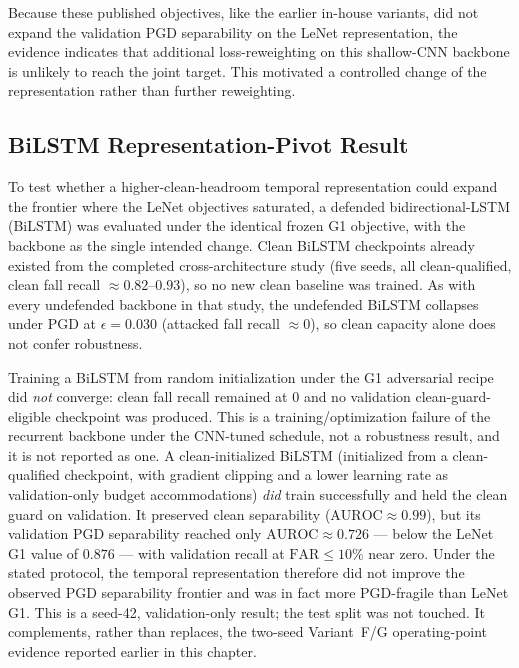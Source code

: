 Because these published objectives, like the earlier in-house variants, did not expand the validation PGD
separability on the LeNet representation, the evidence indicates that additional loss-reweighting on this
shallow-CNN backbone is unlikely to reach the joint target. This motivated a controlled change of the
representation rather than further reweighting.


\subsection{BiLSTM Representation-Pivot Result}
\label{subsec:ch6-bilstm-pivot}

To test whether a higher-clean-headroom temporal representation could expand the frontier where the LeNet
objectives saturated, a defended bidirectional-LSTM (BiLSTM) was evaluated under the identical frozen G1
objective, with the backbone as the single intended change. Clean BiLSTM checkpoints already existed from
the completed cross-architecture study (five seeds, all clean-qualified, clean fall recall \(\approx
0.82\)--\(0.93\)), so no new clean baseline was trained. As with every undefended backbone in that study,
the undefended BiLSTM collapses under PGD at \(\epsilon=0.030\) (attacked fall recall \(\approx 0\)), so
clean capacity alone does not confer robustness.

Training a BiLSTM from random initialization under the G1 adversarial recipe did \emph{not} converge: clean
fall recall remained at \(0\) and no validation clean-guard-eligible checkpoint was produced. This is a
training/optimization failure of the recurrent backbone under the CNN-tuned schedule, not a robustness
result, and it is not reported as one. A clean-initialized BiLSTM (initialized from a clean-qualified
checkpoint, with gradient clipping and a lower learning rate as validation-only budget accommodations)
\emph{did} train successfully and held the clean guard on validation. It preserved clean separability
(\(\mathrm{AUROC}\approx 0.99\)), but its validation PGD separability reached only
\(\mathrm{AUROC}\approx 0.726\) --- below the LeNet G1 value of \(0.876\) --- with validation recall at
\(\mathrm{FAR}\leq 10\%\) near zero. Under the stated protocol, the temporal representation therefore did
not improve the observed PGD separability frontier and was in fact more PGD-fragile than LeNet G1. This is a
seed-42, validation-only result; the test split was not touched. It complements, rather than replaces, the
two-seed Variant~F/G operating-point evidence reported earlier in this chapter.


